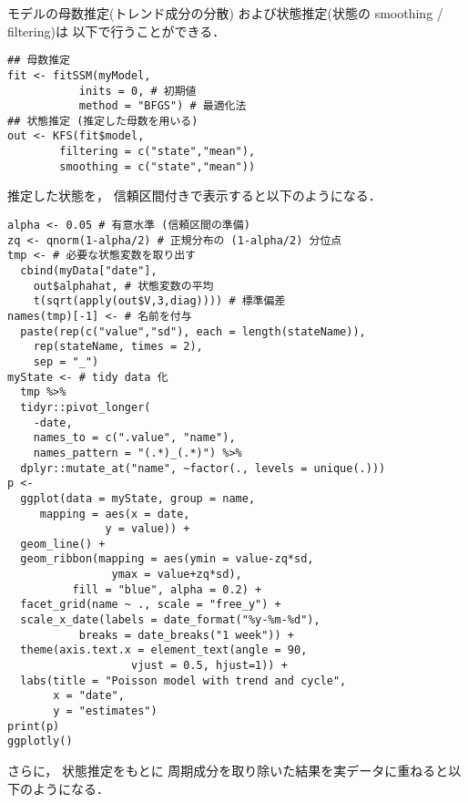 \documentclass[10pt,oneside,fleqn]{scrartcl}
\begin{document}
モデルの母数推定(トレンド成分の分散)
および状態推定(状態の smoothing / filtering)は
以下で行うことができる．

\begin{verbatim}
## 母数推定 
fit <- fitSSM(myModel, 
		   inits = 0, # 初期値
		   method = "BFGS") # 最適化法
## 状態推定 (推定した母数を用いる)
out <- KFS(fit$model,
		filtering = c("state","mean"),
		smoothing = c("state","mean"))
\end{verbatim}

推定した状態を，
信頼区間付きで表示すると以下のようになる．

\begin{figure}[htbp]
  \centering
  \myGraph[1]{}
\end{figure}

\begin{verbatim}
alpha <- 0.05 # 有意水準 (信頼区間の準備)
zq <- qnorm(1-alpha/2) # 正規分布の (1-alpha/2) 分位点
tmp <- # 必要な状態変数を取り出す
  cbind(myData["date"],
	out$alphahat, # 状態変数の平均
	t(sqrt(apply(out$V,3,diag)))) # 標準偏差
names(tmp)[-1] <- # 名前を付与
  paste(rep(c("value","sd"), each = length(stateName)),
	rep(stateName, times = 2),
	sep = "_")
myState <- # tidy data 化
  tmp %>% 
  tidyr::pivot_longer(
    -date,
    names_to = c(".value", "name"), 
    names_pattern = "(.*)_(.*)") %>%
  dplyr::mutate_at("name", ~factor(., levels = unique(.)))
p <- 
  ggplot(data = myState, group = name,
	 mapping = aes(x = date,
		       y = value)) +
  geom_line() +
  geom_ribbon(mapping = aes(ymin = value-zq*sd,
			    ymax = value+zq*sd),
	      fill = "blue", alpha = 0.2) +
  facet_grid(name ~ ., scale = "free_y") + 
  scale_x_date(labels = date_format("%y-%m-%d"), 
	       breaks = date_breaks("1 week")) + 
  theme(axis.text.x = element_text(angle = 90,
				   vjust = 0.5, hjust=1)) +
  labs(title = "Poisson model with trend and cycle",
       x = "date",
       y = "estimates")
print(p)
ggplotly()
\end{verbatim}

さらに，
状態推定をもとに
周期成分を取り除いた結果を実データに重ねると以下のようになる．

\begin{figure}[htbp]
  \centering
  \myGraph[1]{}
\end{figure}
\end{document}
